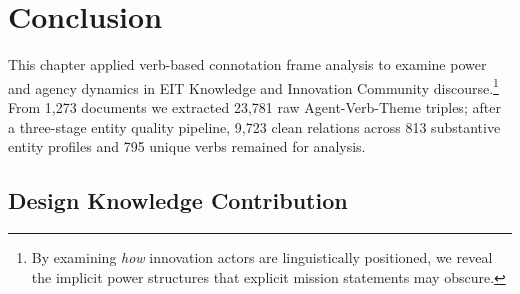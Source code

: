\documentclass[../main.tex]{subfiles}
\begin{document}
\section{Conclusion}

This chapter applied verb-based connotation frame analysis to examine power and agency dynamics in EIT Knowledge and Innovation Community discourse.\footnote{By examining \textit{how} innovation actors are linguistically positioned, we reveal the implicit power structures that explicit mission statements may obscure.} From 1,273 documents we extracted 23,781 raw Agent-Verb-Theme triples; after a three-stage entity quality pipeline, 9,723 clean relations across 813 substantive entity profiles and 795 unique verbs remained for analysis.

%
%
%
%
%

\subsection{Design Knowledge Contribution}
\end{document}
